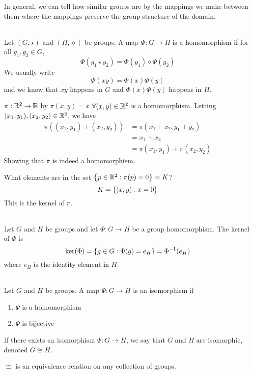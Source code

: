 In general, we can tell how similar groups are by the mappings we make between them where the mappings preserve the group structure of the domain.

\begin{definition}[Homomorphism] \leavevmode \\
    Let $(G, \star)$ and $(H, \diamond)$ be groups. A map $\Phi: G \to H$ is a homomorphism if for all $g_1, g_2 \in G$,
    $$\Phi(g_1 \star g_2) = \Phi(g_1) \diamond \Phi(g_2)$$
    We usually write
    $$\Phi(xy) = \Phi(x) \Phi(y)$$
    and we know that $xy$ happens in $G$ and $\Phi(x)\Phi(y)$ happens in $H$.
\end{definition}

\begin{example}
    $\pi: \mathbb{R}^2 \to \mathbb{R}$ by $\pi(x,y) = x$ $\forall (x,y) \in \mathbb{R}^2$ is a homomorphism. Letting $(x_1, y_1), (x_2, y_2) \in \mathbb{R}^2$, we have
    \begin{align*}
        \pi((x_1, y_1) + (x_2, y_2)) &= \pi(x_1 + x_2, y_1 + y_2) \\
        &= x_1 + x_2 \\
        &= \pi(x_1, y_1) + \pi(x_2, y_2)
    \end{align*}
    Showing that $\pi$ is indeed a homomorphism.

    What elements are in the set $\left\{p \in \mathbb{R}^2 : \pi(p) = 0\right\} = K$?
    $$K = \left\{(x,y) : x=0\right\}$$
    This is the kernel of $\pi$.
\end{example}

\begin{definition}[Kernel] \leavevmode \\
    Let $G$ and $H$ be groups and let $\Phi: G \to H$ be a group homomorphism. The kernel of $\Phi$ is
    $$\ker(\Phi) = \left\{g \in G : \Phi(g) = e_H\right\} = \Phi^{-1}(e_H)$$
    where $e_H$ is the identity element in $H$.
\end{definition}

\begin{definition}[Isomorphism] \leavevmode \\
    Let $G$ and $H$ be groups. A map $\Psi: G \to H$ is an isomorphism if
    \begin{enumerate}
        \item $\Psi$ is a homomorphism
        \item $\Psi$ is bijective
    \end{enumerate}
    If there exists an isomorphism $\Psi: G \to H$, we say that $G$ and $H$ are isomorphic, denoted $G \cong H$.
    
    $\cong$ is an equivalence relation on any collection of groups.
\end{definition}

